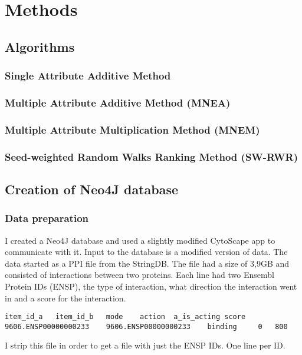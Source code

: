 \part{Methods}
\label{pa:methods}
\chapter{Algorithms}
\section{Single Attribute Additive Method}

\section{Multiple Attribute Additive Method (MNEA)}

\section{Multiple Attribute Multiplication Method (MNEM)}

\section{Seed-weighted Random Walks Ranking Method (SW-RWR)}

\chapter{Creation of Neo4J database} %
\section{Data preparation}
I created a Neo4J database and used a slightly modified CytoScape app to
communicate with it. Input to the database is a modified version of data. The
data started as a PPI file from the StringDB. The file had a size of 3,9GB and
consisted of interactions between two proteins. Each line had two Ensembl
Protein IDs (ENSP), the type of interaction, what direction the interaction went
in and a score for the interaction. 

\begin{verbatim}
item_id_a	item_id_b	mode	action	a_is_acting	score
9606.ENSP00000000233	9606.ENSP00000000233	binding		0	800
\end{verbatim}

I strip this file in order to get a file with just the ENSP IDs. One line per
ID.

